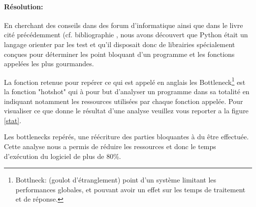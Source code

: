             \paragraph{Résolution:}
En cherchant des conseils dans des forum d'informatique ainsi que dans le livre cité précédemment (cf. bibliographie \cite{pybook}, nous avons découvert que Python était un langage orienter par les test et qu'il disposait donc de librairies spécialement conçues pour déterminer les point bloquant d'un programme et les fonctions appelées les plus gourmandes.

La fonction retenue pour repérer ce qui est appelé en anglais les Bottleneck\footnote{Bottlneck: (goulot d'étranglement) point d'un système limitant les performances globales, et pouvant avoir un effet sur les temps de traitement et de réponse.} est la fonction "hotshot" qui à pour but d'analyser un programme dans sa totalité en indiquant notamment les ressources utilisées par chaque fonction appelée. Pour visualiser ce que donne le résultat d'une analyse veuillez vous reporter a la figure \vref{stat}.

Les bottlenecks repérés, une réécriture des parties bloquantes à du être effectuée. Cette analyse nous a permis de réduire les ressources et donc le temps d'exécution du logiciel de plus de 80\%.
